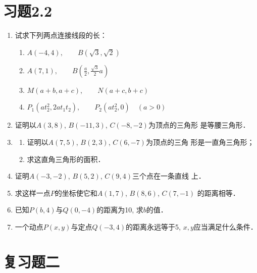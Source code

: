 \section*{习题2.2}
\begin{enumerate}
    \item 试求下列两点连接线段的长：
\begin{enumerate}
    \item $A(-4,4),\qquad B(\sqrt{3},\sqrt{2})$
    \item $A(7,1),\qquad B\left(\frac{a}{2},\frac{\sqrt{3}}{2}a\right)$
    \item $M(a+b,a+c),\qquad N(a+c,b+c)$
    \item $P_1(at^2_2, 2at_1t_2),\qquad P_2(at^2_2,0)\quad (a>0)$
\end{enumerate}

\item 证明以$A(3,8)$, $B(-11,3)$, $C(-8,-2)$为顶点的三角形
是等腰三角形．
\item \begin{enumerate}
    \item 证明以$A(7,5)$, $B(2,3)$, $C(6,-7)$为顶点的三角
形是一直角三角形；
\item 求这直角三角形的面积．
\end{enumerate}

\item  证明$A(-3,-2)$, $B(5,2)$, $C(9,4)$三个点在一条直线
上．
\item 求这样一点$P$的坐标使它和$A(1,7)$, $B(8,6)$, $C(7,-1)$
的距离相等．
\item 已知$P(b,4)$与$Q(0,-4)$的距离为10, 求$b$的值．
\item 一个动点$P(x,y)$与定点$Q(-3,4)$的距离永远等于5, $x,
y$应当满足什么条件．
\end{enumerate}


\section*{复习题二}


